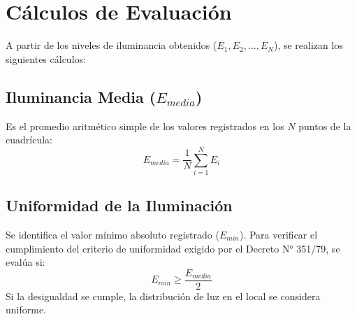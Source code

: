\section{Cálculos de Evaluación}
\label{sec.tp2:calculos_evaluacion}

A partir de los niveles de iluminancia obtenidos ($E_1, E_2, \dots, E_N$), se realizan los siguientes cálculos:

\subsection{Iluminancia Media \texorpdfstring{($E_{media}$)}{(E\_media)}}
Es el promedio aritmético simple de los valores registrados en los $N$ puntos de la cuadrícula:
\begin{equation}
    E_{media} = \frac{1}{N} \sum_{i=1}^{N} E_i
    \label{eq.tp2:iluminancia_media}
\end{equation}

\subsection{Uniformidad de la Iluminación}
Se identifica el valor mínimo absoluto registrado ($E_{min}$). Para verificar el cumplimiento del criterio de uniformidad exigido por el Decreto N° 351/79, se evalúa si:
\begin{equation}
    E_{min} \ge \frac{E_{media}}{2}
    \label{eq.tp2:verificacion_uniformidad}
\end{equation}
Si la desigualdad se cumple, la distribución de luz en el local se considera uniforme.

